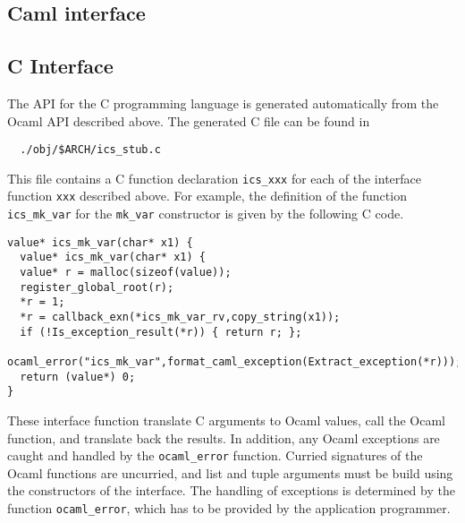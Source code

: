 \documentclass[12pt]{article}
\begin{document}
\subsection{Caml interface}

 

\subsection{C Interface}

The API for the C programming language is generated automatically
from the Ocaml API described above. The generated C file can be found in
  \begin{verbatim}
  ./obj/$ARCH/ics_stub.c
  \end{verbatim}
This file contains a C function declaration \texttt{ics\_xxx} for each of the interface
function \texttt{xxx} described above.  For example, the definition of
the function \texttt{ics\_mk\_var} for the \texttt{mk\_var} constructor is
given by the following C code.
  \begin{verbatim}
value* ics_mk_var(char* x1) {
  value* ics_mk_var(char* x1) {
  value* r = malloc(sizeof(value));
  register_global_root(r);
  *r = 1;
  *r = callback_exn(*ics_mk_var_rv,copy_string(x1));
  if (!Is_exception_result(*r)) { return r; };
  ocaml_error("ics_mk_var",format_caml_exception(Extract_exception(*r)));
  return (value*) 0;
}
 \end{verbatim}
These interface function translate C arguments to Ocaml values, call the
Ocaml function, and translate back the results. In addition, any Ocaml
exceptions are caught and handled by the \texttt{ocaml\_error} function.
Curried signatures of the Ocaml functions are uncurried, and list and
tuple arguments must be build using the constructors of the interface.
The handling of exceptions is determined by the function
\texttt{ocaml\_error}, which has to be provided by the application
programmer.
\end{document}
